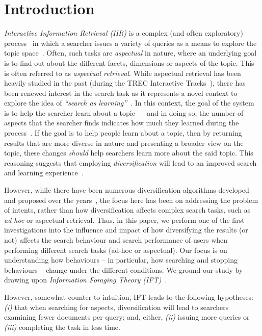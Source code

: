 \section{Introduction} \label{sec:intro}
\emph{Interactive Information Retrieval (IIR)} is a complex (and often exploratory) process~\cite{ingwersen2005theturn} in which a searcher issues a variety of queries as a means to explore the topic space~\cite{kelly2015search_tasks}. Often, such tasks are \emph{aspectual} in nature, where an underlying goal is to find out about the different facets, dimensions or aspects of the topic. This is often referred to as \emph{aspectual retrieval}. While aspectual retrieval has been heavily studied in the past (during the TREC Interactive Tracks~\cite{over2001trec}), there has been renewed interest in the search task as it represents a novel context to explore the idea of \emph{``search as learning''}~\cite{collins2017sal}. In this context, the goal of the system is to help the searcher learn about a topic~\cite{collins2017sal} -- and in doing so, the number of aspects that the searcher finds indicates how much they learned during the process~\cite{syed2017sal}. If the goal is to help people learn about a topic, then by returning results that are more diverse in nature and presenting a broader view on the topic, these changes \emph{should} help searchers learn more about the said topic. This reasoning suggests that employing \emph{diversification} will lead to an improved search and learning experience~\cite{syed2017sal}. 

However, while there have been numerous diversification algorithms developed and proposed over the years~\cite{carbonell1998mmr,chen2006lessismore,santos2010query_reformulations_diversification,santos2011intent,zhai2015subtopics}, the focus here has been on addressing the problem of intents, rather than how diversification affects complex search tasks, such as \emph{ad-hoc} or aspectual retrieval. Thus, in this paper, we perform one of the first investigations into the influence and impact of how diversifying the results (or not) affects the search behaviour and search performance of users when performing different search tasks (ad-hoc or aspectual). Our focus is on understanding how behaviours -- in particular, how searching and stopping behaviours -- change under the different conditions. We ground our study by drawing upon \emph{Information Foraging Theory (IFT)}~\cite{pirolli1999ift}. 

However, somewhat counter to intuition, IFT leads to the following hypotheses: \emph{(i)} that when searching for aspects, diversification will lead to searchers examining fewer documents per query; and, either, \emph{(ii)} issuing more queries or \emph{(iii)} completing the task in less time.

